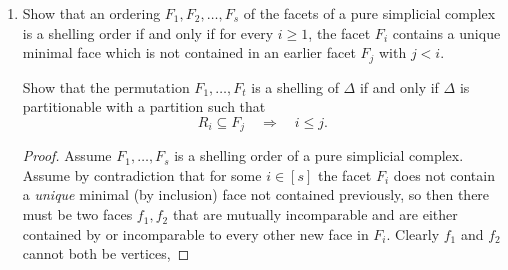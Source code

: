 \documentclass{article}
\begin{document}
\begin{enumerate}
\begin{proof}
\begin{enumerate}[label=(\roman*)]
    \item Label each octant in $\mathbb{R}^d$ with a sign vector in $\{+, -\}^d \cong \{0, 1\}^d$. Notice that for the $d$ dimensional cross-polytope $C_d^\Delta$, there is exactly one facet per octant (move the barycenter of the cross polytope to \textbf{0}). Notice that each octant is adjacent to exactly $d$ others, seen by flipping the $i$'th entry for each $i \in [d]$. We can simply shell lexicographically (i.e. from \textbf{0} to \textbf{1}).

    Thus $|R_j|$ can simply be read off as the number of $1$'s in the sign vector for a corresponding facet. We have $|\{j: |R_j| = i\}| = \binom{d}{i}$, and we have for an index $i$, $|R_i|$ is simply the number of $1$'s in its binary expansion. Then we have
    \[f_{k-1} = \sum_{j} \binom{d-|R_j|}{k-|R_j|} = \sum_{i=0}^k \binom{d}{i}\binom{d-i}{k-i} = \binom{d}{k}2^k.\]
    and
    \[h_k = \sum_{i=0}^k (-1)^{k-i} \binom{d-i}{d-k}f_{i-1} = \sum_{i=0}^k (-1)^{k-i} \binom{d-i}{d-k}\binom{d}{i}2^i = \binom{d}{k}\sum_{i=0}^k (-1)^{k-i}\binom{k}{i}2^i = \binom{d}{k}.\]
    which we would have seen coming anyways.

    \item Apart from the obvious but boring computational route, notice that 
    \[h_i(\bipyr(P)) = h_i(P) + h_{i-1}(P).\]
    One can verify that computing the f-vector of $P$, then the f-vector of $\bipyr(P)$, and then computing the h-vector of $\bipyr(P)$ yields the same relation.

    \item Immediate for $d \leq 3$. Then for $C_4^\Delta$

\end{enumerate}
\end{proof}

\item Show that an ordering $F_1, F_2, \ldots, F_s$ of the facets of a pure simplicial complex is a shelling order if and only if for every $i \ge 1$, the facet $F_i$ contains a unique minimal face which is not contained in an earlier facet $F_j$ with $j<i$.

Show that the permutation $F_1,\ldots,F_t$ is a shelling of $\Delta$ if and only if $\Delta$ is partitionable with a partition such that
\[
R_i \subseteq F_j \quad \Longrightarrow \quad i \le j.
\]

\begin{proof}
Assume $F_1, \ldots, F_s$ is a shelling order of a pure simplicial complex. Assume by contradiction that for some $i \in [s]$ the facet $F_i$ does not contain a \textit{unique} minimal (by inclusion) face not contained previously, so then there must be two faces $f_1, f_2$ that are mutually incomparable and are either contained by or incomparable to every other new face in $F_i$. Clearly $f_1$ and $f_2$ cannot both be vertices, 
\end{proof}


\end{enumerate}
\end{document}
